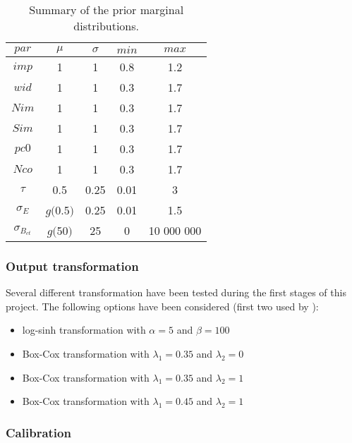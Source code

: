 \documentclass{ctuthesis}\usepackage[]{graphicx}\usepackage[]{color}
\begin{document}
\begin{table}[H]
\centering
\begin{tabular}{ c | c | c | c | c }
	$par$		&	$\mu$ & 	$\sigma$	& 	$min$ 			& 	 $max$  \\ \hline \hline

	$imp$		&	1	&	1		&	0.8			&	1.2		\\ \hline
	$wid$		&	1	&	1		&	0.3			&	1.7		\\ \hline
	$Nim$		&	1	&	1		&	0.3			&	1.7		\\ \hline
	$Sim$		&	1	&	1		&	0.3			&	1.7		\\ \hline
	$pc0$		&	1	&	1		&	0.3			&	1.7		\\ \hline
	$Nco$		&	1	&	1		&	0.3			&	1.7		\\ \hline
	
	$\tau$		&	0.5		&	0.25		&	0.01			&	3	\\ \hline
	$\sigma_E$		&	$g($0.5$)$	&	0.25		&	0.01			&	1.5	\\ \hline
	$\sigma_{B_{ct}}$	&	$g($50$)$	&	25		&	0			&	10 000 000
	
	
\end{tabular}
\caption{Summary of the prior marginal distributions.}
\label{kalibracia_tab}
\end{table}

\subsubsection{Output transformation}

Several different transformation have been tested during the first stages of this project. The following options have been considered (first two used by \cite{giudice2013improving}): 
\begin{itemize}
	\item   log-sinh transformation with $\alpha=5$ and  $\beta=100$  
	\item   Box-Cox transformation with $\lambda_1 = 0.35$ and $\lambda_2 = 0$
	\item   Box-Cox transformation with $\lambda_1 = 0.35$ and $\lambda_2 = 1$
	\item   Box-Cox transformation with $\lambda_1 = 0.45$ and $\lambda_2 = 1$	
\end{itemize}


\subsubsection{Calibration}
\end{document}

